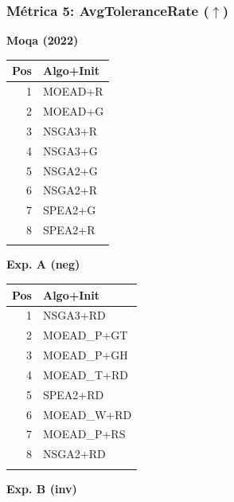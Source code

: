 \documentclass[a4paper,10pt]{article}
\begin{document}
\subsubsection{Métrica 5: AvgToleranceRate \texorpdfstring{($\uparrow$)}{(up)}}
\begin{table}[H]
    \centering
    \begin{minipage}[t]{0.32\textwidth}
        \centering\scriptsize\textbf{Moqa (2022)}\\
        \begin{tabular}{rl}
            \toprule
            Pos & Algo+Init \\ \midrule
            1 & MOEAD+R \\
            2 & MOEAD+G \\
            3 & NSGA3+R \\
            4 & NSGA3+G \\
            5 & NSGA2+G \\
            6 & NSGA2+R \\
            7 & SPEA2+G \\
            8 & SPEA2+R \\
            \\
            \bottomrule
        \end{tabular}
    \end{minipage}
    \hfill
    \begin{minipage}[t]{0.32\textwidth}
        \centering\scriptsize\textbf{Exp. A (neg)}\\
        \begin{tabular}{rl}
            \toprule
            Pos & Algo+Init \\ \midrule
            1 & NSGA3+RD \\
            2 & MOEAD\_P+GT \\
            3 & MOEAD\_P+GH \\
            4 & MOEAD\_T+RD \\
            5 & SPEA2+RD \\
            6 & MOEAD\_W+RD \\
            7 & MOEAD\_P+RS \\
            8 & NSGA2+RD \\
            \\
            \bottomrule
        \end{tabular}
    \end{minipage}
    \hfill
    \begin{minipage}[t]{0.32\textwidth}
        \centering\scriptsize\textbf{Exp. B (inv)}\\

\end{minipage}
\end{table}
\end{document}
